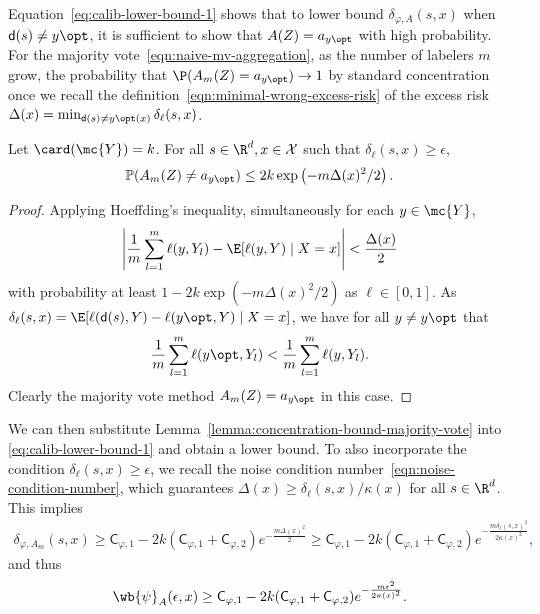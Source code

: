 \documentclass[11pt]{article}
\newcommand{\Prb}{\mathbb{P}}
\newcommand{\prn}[1]{\left({#1}\right)} %
\newcommand{\constant}{\mathsf{C}}  %
\newcommand{\pred}{\mathsf{d}}  %
\newcommand{\sX}{\mathcal{X}} %
\newcommand{\tloss}{\ell}  %
\newcommand{\sloss}{\varphi}  %
\newcommand{\extloss}{\delta_\tloss}
\newcommand{\exslossagg}{\delta_{\sloss,A}}
\begin{document}
Equation~\eqref{eq:calib-lower-bound-1}
shows that to lower bound
$\exslossagg(s, x)$ when $\pred(s) \neq y\opt$,
it is sufficient to show that $A(Z) = a_{y\opt}$ with high probability.
%
For the majority vote~\eqref{eqn:naive-mv-aggregation},
as the number of labelers $m$ grow, the probability that
$\P(A_m(Z) = a_{y\opt}) \to 1$ by standard concentration
once we recall the definition~\eqref{eqn:minimal-wrong-excess-risk}
of the excess risk $\Delta(x) = \min_{\pred(s) \neq y\opt(x)}
\extloss(s, x)$.
\begin{lemma}
  \label{lemma:concentration-bound-majority-vote}
  Let $\card(\mc{Y}) = k$.
  For all $s \in \R^d, x \in \sX$ such that $\extloss (s,x) \geq
  \epsilon$,
  \begin{align*}
    \Prb(A_m(Z) \neq a_{y\opt}) \leq 2k \exp \prn{-m \Delta(x)^2/2}.
  \end{align*}
\end{lemma}
\begin{proof}
  Applying Hoeffding's inequality, simultaneously for each $y \in \mc{Y}$,
  \begin{align*}
    \left|\frac{1}{m} \sum_{l= 1}^m \tloss(y, Y_l) -
    \E[\tloss(y, Y) \mid X = x] \right| < \frac{\Delta(x)}{2}
  \end{align*}
  with probability at least $1 - 2k \exp \prn{-m\Delta(x)^2/2}$ as
  $\tloss \in [0,1]$.
  As $\extloss(s, x) = \E[\tloss(\pred(s), Y) - \tloss(y\opt, Y) \mid X = x]$,
  we have for all $y \neq y\opt$ that
  \begin{align*}
    \frac{1}{m} \sum_{l= 1}^m \tloss(y\opt, Y_l)
    < \frac{1}{m} \sum_{l= 1}^m \tloss(y, Y_l).
  \end{align*}
  Clearly the majority vote method $A_m(Z) = a_{y\opt}$ in this case.
\end{proof}

We can then substitute Lemma~\ref{lemma:concentration-bound-majority-vote}
into \eqref{eq:calib-lower-bound-1} and obtain a lower bound.
%
To also incorporate the condition $\extloss(s,x) \geq \epsilon$, we recall
the noise condition number~\eqref{eqn:noise-condition-number}, which
guarantees $\Delta(x) \geq \extloss(s,x) / \kappa(x)$ for all $s \in \R^d$.
%
This implies
\begin{align*}
  \delta_{\varphi, {A_m}} (s, x)  \geq \constant_{\sloss, 1} - 2k(\constant_{\sloss, 1}+\constant_{\sloss, 2}) e^{-\frac{m\Delta(x)^2}{2}}  \geq \constant_{\sloss, 1} - 2k(\constant_{\sloss, 1}+\constant_{\sloss, 2}) e^{-\frac{m \extloss(s,x)^2}{2\kappa(x)^2}},
\end{align*}
and thus
\begin{equation*}
  \wb{\psi}_A(\epsilon, x) \geq \constant_{\sloss, 1} - 2k(\constant_{\sloss, 1}+\constant_{\sloss, 2}) e^{-\frac{m\epsilon^2}{2\kappa(x)^2}}.
\end{equation*}
\end{document}
